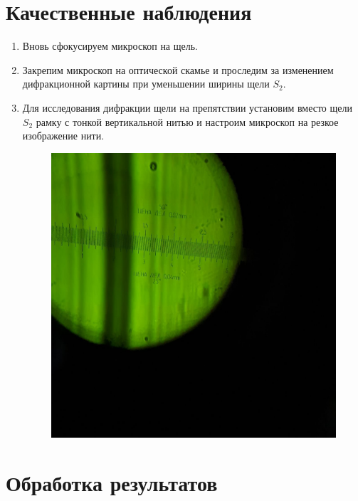 \documentclass[14pt, a4paper]{report}
\begin{document}
\section{Качественные наблюдения}

\begin{enumerate}

\item Вновь сфокусируем микроскоп на щель.

\item Закрепим микроскоп на оптической скамье и проследим за изменением дифракционной картины при уменьшении ширины щели $S_2$.

\item Для исследования дифракции щели на препятствии установим вместо щели $S_2$ рамку с тонкой вертикальной нитью и настроим микроскоп на резкое изображение нити.

\begin{figure}[H]
\centering
\includegraphics[scale=0.2]{../images/431_6}
\end{figure}

\end{enumerate}

\section{Обработка результатов}
\end{document}

